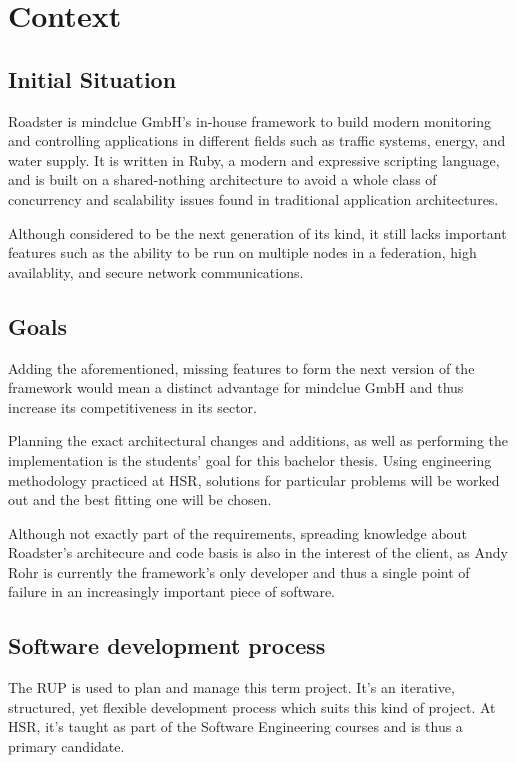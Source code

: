 \chapter{Context}
\section{Initial Situation}
Roadster is mindclue GmbH's in-house framework to build modern monitoring and
controlling applications in different fields such as traffic systems, energy,
and water supply. It is written in Ruby, a modern and expressive scripting
language, and is built on a shared-nothing architecture to avoid a whole class
of concurrency and scalability issues found in traditional application
architectures.

Although considered to be the next generation of its kind, it still lacks
important features such as the ability to be run on multiple
nodes in a federation, high availablity, and secure network communications.

\section{Goals}
Adding the aforementioned, missing features to form the next version of the
framework would mean a distinct advantage for mindclue GmbH and thus increase
its competitiveness in its sector.

Planning the exact architectural changes and additions, as well as performing
the implementation is the students' goal for this bachelor thesis. Using
engineering methodology practiced at HSR, solutions for particular problems
will be worked out and the best fitting one will be chosen.

Although not exactly part of the requirements, spreading knowledge about Roadster's
architecure and code basis is also in the interest of the client, as Andy Rohr
is currently the framework's only developer and thus a single point of failure
in an increasingly important piece of software.

\section{Software development process}
The \gls{RUP} is used to plan and manage this term project. It’s an iterative,
structured, yet flexible development process which suits this kind of project.
At HSR, it’s taught as part of the Software Engineering courses and is thus a
primary candidate.

